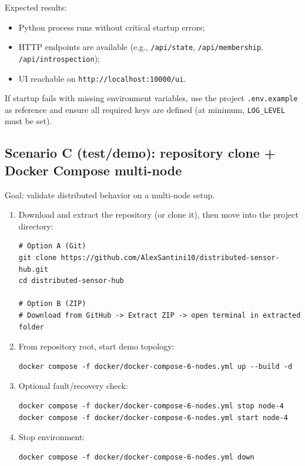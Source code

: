 Expected results:
\begin{itemize}
  \item Python process runs without critical startup errors;
  \item HTTP endpoints are available (e.g., \texttt{/api/state}, \texttt{/api/membership}, \texttt{/api/introspection});
  \item UI reachable on \texttt{http://localhost:10000/ui}.
\end{itemize}

If startup fails with missing environment variables, use the project \texttt{.env.example} as reference and ensure all required keys are defined (at minimum, \texttt{LOG\_LEVEL} must be set).

\subsection{Scenario C (test/demo): repository clone + Docker Compose multi-node}

Goal: validate distributed behavior on a multi-node setup.

\begin{enumerate}
  \item Download and extract the repository (or clone it), then move into the project directory:
\begin{verbatim}
# Option A (Git)
git clone https://github.com/AlexSantini10/distributed-sensor-hub.git
cd distributed-sensor-hub

# Option B (ZIP)
# Download from GitHub -> Extract ZIP -> open terminal in extracted folder
\end{verbatim}
  \item From repository root, start demo topology:
\begin{verbatim}
docker compose -f docker/docker-compose-6-nodes.yml up --build -d
\end{verbatim}
  \item Optional fault/recovery check:
\begin{verbatim}
docker compose -f docker/docker-compose-6-nodes.yml stop node-4
docker compose -f docker/docker-compose-6-nodes.yml start node-4
\end{verbatim}
  \item Stop environment:
\begin{verbatim}
docker compose -f docker/docker-compose-6-nodes.yml down
\end{verbatim}
\end{enumerate}

